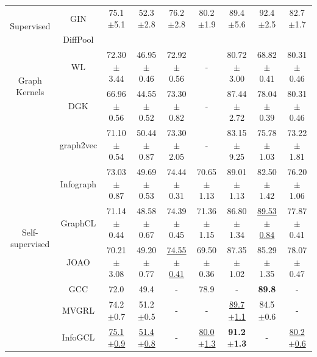 {\begin{table}[htbp]
\begin{threeparttable}
\begin{tabular}{c|c|ccccccc}
        \midrule
        \multirow{2}{*}{Supervised}
        & GIN         & 75.1$\pm$5.1   & 52.3$\pm$2.8   & 76.2$\pm$2.8   & 80.2$\pm$1.9   & 89.4$\pm$5.6   & 92.4$\pm$2.5   & 82.7$\pm$1.7 \\ %
        & DiffPool \\
        \midrule
        \multirow{2}{*}{Graph Kernels}
        & WL          & 72.30$\pm$3.44 & 46.95$\pm$0.46 & 72.92$\pm$0.56 & - & 80.72$\pm$3.00 & 68.82$\pm$0.41 & 80.31$\pm$0.46 \\ %
        & DGK         & 66.96$\pm$0.56 & 44.55$\pm$0.52 & 73.30$\pm$0.82 & - & 87.44$\pm$2.72 & 78.04$\pm$0.39 & 80.31$\pm$0.46 \\ %
        \midrule
        \multirow{8}{*}{Self-supervised}
        & graph2vec   & 71.10$\pm$0.54 & 50.44$\pm$0.87 & 73.30$\pm$2.05 & -              & 83.15$\pm$9.25 & 75.78$\pm$1.03 & 73.22$\pm$1.81 \\ %
        & Infograph   & 73.03$\pm$0.87 & 49.69$\pm$0.53 & 74.44$\pm$0.31 & 70.65$\pm$1.13 & 89.01$\pm$1.13 & 82.50$\pm$1.42 & 76.20$\pm$1.06 \\%
        & GraphCL     & 71.14$\pm$0.44 & 48.58$\pm$0.67 & 74.39$\pm$0.45 & 71.36$\pm$1.15 & 86.80$\pm$1.34 & \underline{89.53$\pm$0.84} & 77.87$\pm$0.41 \\%
        & JOAO        & 70.21$\pm$3.08 & 49.20$\pm$0.77     & \underline{74.55$\pm$0.41} & 69.50$\pm$0.36 & 87.35$\pm$1.02 & 85.29$\pm$1.35 & 78.07$\pm$0.47 \\%
        & GCC         & 72.0           & 49.4           & -    & 78.9    &  - & \bf 89.8 & - \\%
        & MVGRL       & 74.2$\pm$0.7   & 51.2$\pm$0.5   & -              & -              & \underline{89.7$\pm$1.1}   & 84.5$\pm$0.6   & -               \\%
        & InfoGCL     & \underline{75.1$\pm$0.9}   & \underline{51.4$\pm$0.8}   &  -             & \underline{80.0$\pm$1.3}   & \bf 91.2$\pm$1.3   & -              &  \underline{80.2$\pm$0.6}   \\%

\end{tabular}
\end{threeparttable}
\end{table}}
